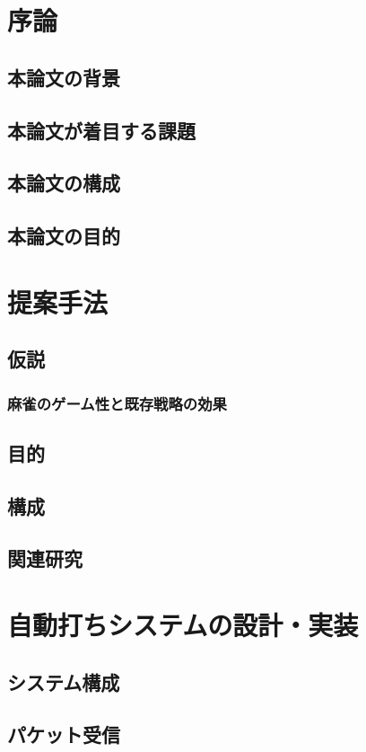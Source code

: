 \chapter{序論}
\label{chap:video-transmission}
\section{本論文の背景}
\section{本論文が着目する課題}
\section{本論文の構成}
\section{本論文の目的}

\chapter{提案手法}
\label{chap:network-transmission}
\section{仮説}
\subsection{麻雀のゲーム性と既存戦略の効果}
\section{目的}
\section{構成}
\section{関連研究}

\chapter{自動打ちシステムの設計・実装}
\label{chap:implementation}
\section{システム構成} %
\section{パケット受信}

